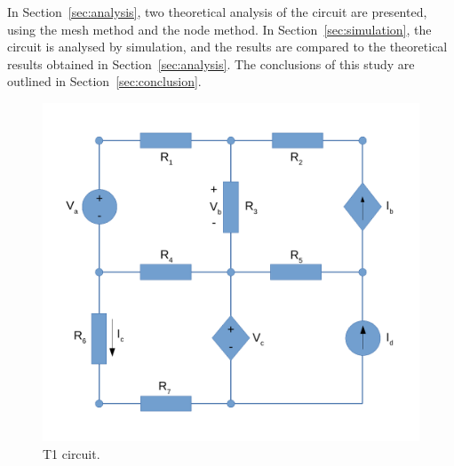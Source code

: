 In Section~\ref{sec:analysis}, two theoretical analysis of the circuit are
presented, using the mesh method and the node method. In Section~\ref{sec:simulation}, the circuit is analysed by
simulation, and the results are compared to the theoretical results obtained in
Section~\ref{sec:analysis}. The conclusions of this study are outlined in
Section~\ref{sec:conclusion}.

\begin{figure}[h] \centering
\includegraphics[width=0.5\linewidth]{Circuit.pdf}
\caption{T1 circuit.}
\label{fig:Circuit}
\end{figure}
